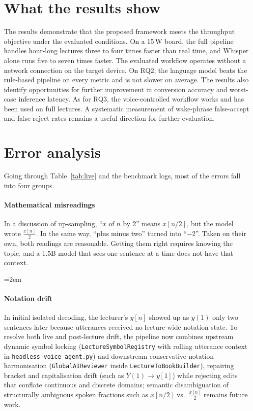 \documentclass[11pt,a4paper,oneside]{report}
\theoremstyle{definition}
\newcommand{\code}[1]{\texttt{\small #1}}
\begin{document}
\section{What the results show}
\label{chap:discussion}
The results demonstrate that the proposed framework meets the throughput objective under the evaluated conditions. On a 15\,W board, the full pipeline handles hour-long lectures three to four times faster than real time, and Whisper alone runs five to seven times faster. The evaluated workflow operates without a network connection on the target device. On RQ2, the language model beats the rule-based pipeline on every metric and is not slower on average. The results also identify opportunities for further improvement in conversion accuracy and worst-case inference latency. As for RQ3, the voice-controlled workflow works and has been used on full lectures. A systematic measurement of wake-phrase false-accept and false-reject rates remains a useful direction for further evaluation.

\section{Error analysis}
\label{sec:err}
Going through Table~\ref{tab:live} and the benchmark logs, most of the errors fall into four groups.

\paragraph{Mathematical misreadings} In a discussion of up-sampling, ``$x$ of $n$ by 2'' means $x[n/2]$, but the model wrote $\frac{x[n]}{2}$. In the same way, ``plus minus two'' turned into ``$-2$''. Taken on their own, both readings are reasonable. Getting them right requires knowing the topic, and a 1.5B model that sees one sentence at a time does not have that context.

\begingroup\emergencystretch=2em
\paragraph{Notation drift} In initial isolated decoding, the lecturer's $y[n]$ showed up as $y(1)$ only two sentences later because utterances received no lecture-wide notation state. To resolve both live and post-lecture drift, the pipeline now combines upstream dynamic symbol locking (\code{LectureSymbolRegistry} with rolling utterance context in \code{headless\_voice\_agent.py}) and downstream conservative notation harmonisation (\code{GlobalAIReviewer} inside \code{LectureToBookBuilder}), repairing bracket and capitalisation drift (such as $Y(1) \to y[1]$) while rejecting edits that conflate continuous and discrete domains; semantic disambiguation of structurally ambiguous spoken fractions such as $x[n/2]$ vs.\ $\frac{x[n]}{2}$ remains future work.
\endgroup
\end{document}
